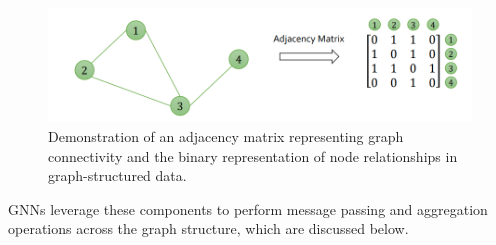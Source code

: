 \begin{figure}[ht]
  \centering
  \includegraphics[width=12cm]{images/Theory-DL/AdjMat.png}
  \caption{Demonstration of an adjacency matrix representing graph connectivity and the binary representation of node relationships in graph-structured data.}
  \label{fig:AdjMat}
\end{figure}
GNNs leverage these components to perform message passing and aggregation operations across the graph structure, which are discussed below. \\
